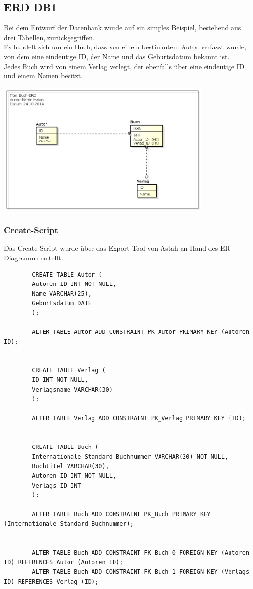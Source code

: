 \documentclass[a4paper]{article}
\begin{document}
	\subsection{ERD DB1}
	Bei dem Entwurf der Datenbank wurde auf ein simples Beispiel, bestehend aus drei Tabellen, zurückgegriffen.\\
	Es handelt sich um ein Buch, dass von einem bestimmtem Autor verfasst wurde, von dem eine eindeutige ID, der Name und das Geburtsdatum bekannt ist.\\
	Jedes Buch wird von einem Verlag verlegt, der ebenfalls über eine eindeutige ID und einem Namen besitzt.
	\begin{center}
		\includegraphics[width=0.8\textwidth]{img/buch-erd.png}
	\end{center}
	
	\subsubsection{Create-Script}
	Das Create-Script wurde über das Export-Tool von Astah an Hand des ER-Diagramms erstellt.\\
	\begin{tiny}
		\begin{lstlisting}
		CREATE TABLE Autor (
		Autoren ID INT NOT NULL,
		Name VARCHAR(25),
		Geburtsdatum DATE
		);
		
		ALTER TABLE Autor ADD CONSTRAINT PK_Autor PRIMARY KEY (Autoren ID);
		
		
		CREATE TABLE Verlag (
		ID INT NOT NULL,
		Verlagsname VARCHAR(30)
		);
		
		ALTER TABLE Verlag ADD CONSTRAINT PK_Verlag PRIMARY KEY (ID);
		
		
		CREATE TABLE Buch (
		Internationale Standard Buchnummer VARCHAR(20) NOT NULL,
		Buchtitel VARCHAR(30),
		Autoren ID INT NOT NULL,
		Verlags ID INT
		);
		
		ALTER TABLE Buch ADD CONSTRAINT PK_Buch PRIMARY KEY (Internationale Standard Buchnummer);
		
		
		ALTER TABLE Buch ADD CONSTRAINT FK_Buch_0 FOREIGN KEY (Autoren ID) REFERENCES Autor (Autoren ID);
		ALTER TABLE Buch ADD CONSTRAINT FK_Buch_1 FOREIGN KEY (Verlags ID) REFERENCES Verlag (ID);
		\end{lstlisting}
	\end{tiny}
	
\end{document}
